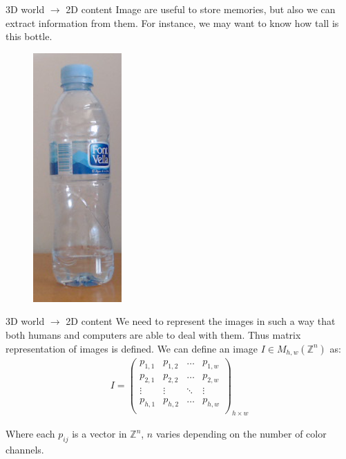 \begin{frame}{\secname}{3D world $\rightarrow$ 2D content}
    Image are useful to store memories, but also we can extract information from them. For instance, we may want to know how tall is this bottle.
    \begin{figure}
        \centering
        \includegraphics[height=0.5\textheight]{img/agua.png}
    \end{figure}
\end{frame}

\begin{frame}{\secname}{3D world $\rightarrow$ 2D content}
    We need to represent the images in such a way that both humans and computers are able to deal with them. Thus matrix representation of images is defined. We can define an image $I \in M_{h,w}\left(\mathbb{Z}^n\right)$ as:
    \begin{gather*}
        I = \begin{pmatrix}
            p_{1,1} & p_{1,2} & \dots & p_{1,w} \\
            p_{2,1} & p_{2,2} & \dots & p_{2,w} \\
            \vdots & \vdots & \ddots & \vdots \\
            p_{h,1} & p_{h,2} & \dots & p_{h,w} \\
        \end{pmatrix}_{h \times w}
    \end{gather*}
    
    Where each $p_{ij}$ is a vector in $\mathbb{Z}^n$, $n$ varies depending on the number of color channels.
\end{frame}

